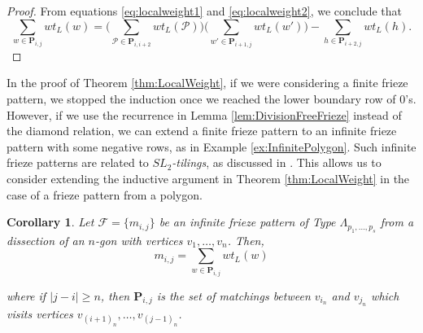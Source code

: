 \documentclass[12pt]{article}
\newtheorem{corollary}{Corollary}
\theoremstyle{remark}
\newcommand*{\pathset}[2]{\mathbf{P}_{#1,#2}}
\begin{document}
\begin{proof}
From equations \ref{eq:localweight1} and \ref{eq:localweight2}, we conclude that \[
\sum_{w \in \pathset{i}{j}} wt_L(w) = \bigg(\sum_{\mathcal{P} \in \pathset{i}{i+2}} wt_L(\mathcal{P}) \bigg)\bigg( \sum_{w' \in \pathset{i+1}{j}} wt_L(w')\bigg) - \sum_{h \in \pathset{i+2}{j}} wt_L(h).
\]
\end{proof}

In the proof of Theorem \ref{thm:LocalWeight}, if we were considering a finite frieze pattern, we stopped the induction once we reached the lower boundary row of 0's. However, if we use the recurrence in Lemma \ref{lem:DivisionFreeFrieze} instead of the diamond relation, we can extend a finite frieze pattern to an infinite frieze pattern with some negative rows, as in Example \ref{ex:InfinitePolygon}. Such infinite frieze patterns are related to \emph{$SL_2$-tilings}, as discussed in \cite{7}. 
This allows us to consider extending the inductive argument in Theorem \ref{thm:LocalWeight} in the case of a frieze pattern from a polygon.

\begin{corollary}\label{cor:InfinitePolygonMatching}
Let $\mathcal{F} = \{m_{i,j}\}$ be an \emph{infinite} frieze pattern of Type $\Lambda_{p_1,\ldots,p_s}$ from a dissection of an $n$-gon with vertices $v_1,\ldots,v_n$. Then,\[
m_{i,j} = \sum_{w \in \pathset{i}{j}} wt_L(w)
\]

where if $\vert j - i \vert \geq n$, then $\pathset{i}{j}$ is the set of matchings between $v_{i_n}$ and $v_{j_n}$ which visits vertices $v_{(i+1)_n},\ldots,v_{(j-1)_n}$.
\end{corollary}
\end{document}
